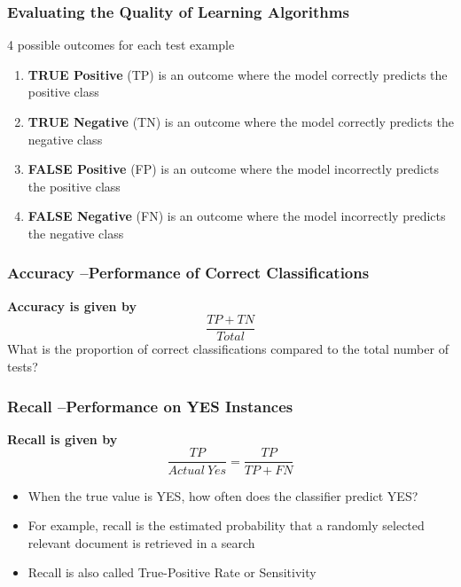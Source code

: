 \documentclass[conference, a4paper]{styles/acmsiggraph}
\begin{document}
        \subsubsection{Evaluating the Quality of Learning Algorithms}
            4 possible outcomes for each test example
            \begin{enumerate}
                \item \textbf{TRUE Positive} (TP)\newline 
                is an outcome where the model correctly predicts the positive class
                \item \textbf{TRUE Negative} (TN)\newline 
                is an outcome where the model correctly predicts the negative class
                \item \textbf{FALSE Positive} (FP)\newline 
                is an outcome where the model incorrectly predicts the positive class
                \item \textbf{FALSE Negative} (FN)\newline 
                is an outcome where the model incorrectly predicts the negative class
            \end{enumerate}
        
        \subsubsection{Accuracy –Performance of Correct Classifications}
            \textbf{Accuracy is given by} $$\frac{TP + TN}{Total}$$
            What is the proportion of correct classifications compared to the total number of tests?
        
        \subsubsection{Recall –Performance on YES Instances}
            \textbf{Recall is given by} $$\frac{TP}{Actual\ Yes} = \frac{TP}{TP + FN}$$
            \begin{itemize}
                \item When the true value is YES, how often does the classifier predict YES?
                \item For example, recall is the estimated probability that a randomly selected relevant document is retrieved in a search
                \item Recall is also called True-Positive Rate or Sensitivity
            \end{itemize}
        
\end{document}
